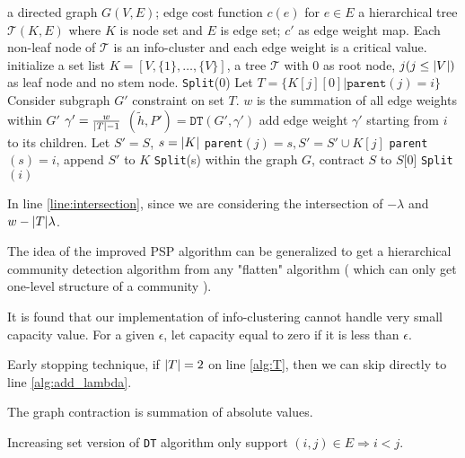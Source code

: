 \documentclass{article}
\begin{document}
\begin{algorithm}
\caption{}\label{alg:psp_a}
\begin{algorithmic}[1]
\REQUIRE a directed graph $G(V, E)$; edge cost function $c(e)$ for $e\in E$
\ENSURE a hierarchical tree $\mathcal{T}(K, E)$ where $K$ is node set and $E$ is edge set; $c'$ as edge weight map. Each non-leaf node of $\mathcal{T}$ is an info-cluster and each edge weight is a critical value. 
\STATE initialize a set list $K=[V, \{1\}, \dots, \{V\}]$, a tree $\mathcal{T}$ with 0 as root node, $j(j\leq \lvert V\rvert)$ as leaf node and no stem node.
\STATE \texttt{Split}(0)
\STATE Let $T=\{K[j][0] | \texttt{parent}(j) = i\}$
\STATE Consider subgraph $G'$ constraint on set $T$. $w$ is the summation of all edge weights within $G'$ 
\STATE $\gamma' = \frac{w}{\lvert T\rvert-1}$ \label{line:intersection}  \label{alg:T}
\STATE $(\tilde{h}, P') = \texttt{DT}(G', \gamma')$
\STATE add edge weight $\gamma'$ starting from $i$ to its children. \label{alg:add_lambda}
\ELSE
{}
\STATE Let $S'=S$, $s=\lvert K\rvert$%
\STATE \texttt{parent}$(j)=s, S'=S'\cup K[j]$
\ENDIF
\ENDFOR
\STATE \texttt{parent}$(s)=i$, append $S'$ to $K$
\STATE \texttt{Split}(s)
\STATE within the graph $G$, contract $S$ to $S$[0]
\ENDFOR
\STATE \texttt{Split}$(i)$ %
\ENDIF
\ENDFUNCTION
\end{algorithmic}
\end{algorithm}
In line \ref{line:intersection}, since we are considering the intersection of $-\lambda$ and $w-\lvert T\rvert\lambda $.

The idea of the improved PSP algorithm can be generalized to get a hierarchical community detection algorithm from any "flatten" algorithm ( which can only get one-level structure of a community ).

It is found that our implementation of info-clustering cannot handle very small capacity value. For a given $\epsilon$, let capacity equal to zero if it is less than $\epsilon$.

Early stopping technique, if $\lvert T\rvert=2$ on line \ref{alg:T}, then we can skip directly to line \ref{alg:add_lambda}.

The graph contraction is summation of absolute values.

Increasing set version of  \texttt{DT} algorithm only support $(i,j) \in E \Rightarrow i<j$.
\end{document}
